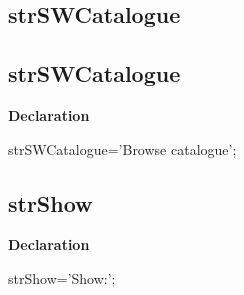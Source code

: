 \documentclass{report}
\newif\ifpdf
\begin{document}
\subsection*{\large{\textbf{strSWCatalogue}}\normalsize\hspace{1ex}\hrulefill}
\else
\subsection*{strSWCatalogue}
\fi
\label{trstrings-strSWCatalogue}
\begin{list}{}{
\setlength{\itemindent}{0cm}
\setlength{\listparindent}{0cm}
\setlength{\leftmargin}{\evensidemargin}
\addtolength{\leftmargin}{\tmplength}
\settowidth{\labelsep}{X}
\addtolength{\leftmargin}{\labelsep}
\setlength{\labelwidth}{\tmplength}
}
\item[\textbf{Declaration}\hfill]
\ifpdf
\begin{flushleft}
\fi
\begin{ttfamily}
strSWCatalogue='Browse catalogue';\end{ttfamily}

\ifpdf
\end{flushleft}
\fi

\end{list}
\ifpdf
\subsection*{\large{\textbf{strShow}}\normalsize\hspace{1ex}\hrulefill}
\else
\subsection*{strShow}
\fi
\label{trstrings-strShow}
\begin{list}{}{
\setlength{\itemindent}{0cm}
\setlength{\listparindent}{0cm}
\setlength{\leftmargin}{\evensidemargin}
\addtolength{\leftmargin}{\tmplength}
\settowidth{\labelsep}{X}
\addtolength{\leftmargin}{\labelsep}
\setlength{\labelwidth}{\tmplength}
}
\item[\textbf{Declaration}\hfill]
\ifpdf
\begin{flushleft}
\fi
\begin{ttfamily}
strShow='Show:';\end{ttfamily}

\ifpdf
\end{flushleft}
\fi

\end{list}
\ifpdf
\end{document}
